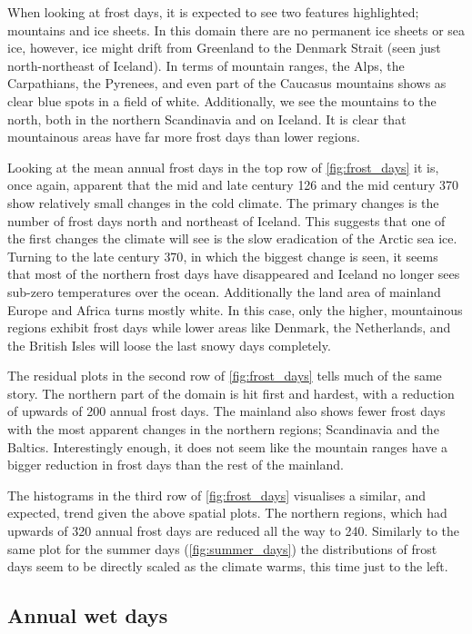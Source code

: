 When looking at frost days, it is expected to see two features highlighted; mountains and ice sheets. In this domain there are no permanent ice sheets or sea ice, however, ice might drift from Greenland to the Denmark Strait (seen just north-northeast of Iceland). In terms of mountain ranges, the Alps, the Carpathians, the Pyrenees, and even part of the Caucasus mountains shows as clear blue spots in a field of white. Additionally, we see the mountains to the north, both in the northern Scandinavia and on Iceland. It is clear that mountainous areas have far more frost days than lower regions. 

Looking at the mean annual frost days in the top row of \autoref{fig:frost_days} it is, once again, apparent that the mid and late century \gls{126} and the mid century \gls{370} show relatively small changes in the cold climate. The primary changes is the number of frost days north and northeast of Iceland. This suggests that one of the first changes the climate will see is the slow eradication of the Arctic sea ice. Turning to the late century \gls{370}, in which the biggest change is seen, it seems that most of the northern frost days have disappeared and Iceland no longer sees sub-zero temperatures over the ocean. Additionally the land area of mainland Europe and Africa turns mostly white. In this case, only the higher, mountainous regions exhibit frost days while lower areas like Denmark, the Netherlands, and the British Isles will loose the last snowy days completely.

The residual plots in the second row of \autoref{fig:frost_days} tells much of the same story. The northern part of the domain is hit first and hardest, with a reduction of upwards of 200 annual frost days. The mainland also shows fewer frost days with the most apparent changes in the northern regions; Scandinavia and the Baltics. Interestingly enough, it does not seem like the mountain ranges have a bigger reduction in frost days than the rest of the mainland. 

The histograms in the third row of \autoref{fig:frost_days} visualises a similar, and expected, trend given the above spatial plots. The northern regions, which had upwards of 320 annual frost days are reduced all the way to 240. Similarly to the same plot for the summer days (\autoref{fig:summer_days}) the distributions of frost days seem to be directly scaled as the climate warms, this time just to the left. 

\subsection{Annual wet days}

